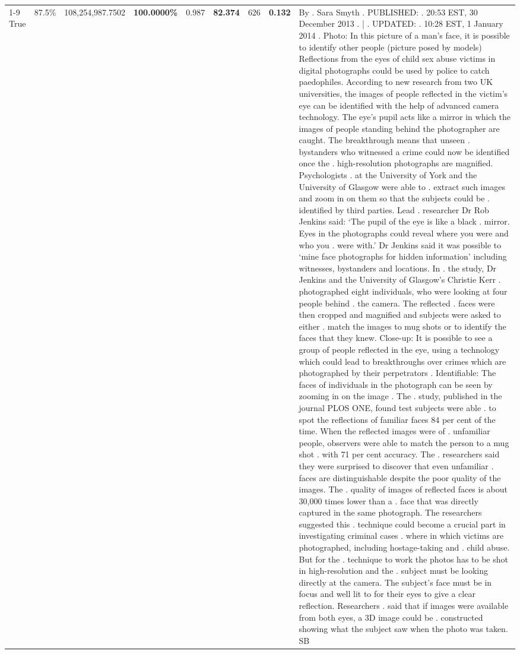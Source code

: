 \begin{table}[H]
\begin{tabular}{lllrlllll}
\cline{1-9} \cline{2-9}
True & 87.5\% & 108,254,987.7502 & \bfseries \color{red} 100.0000\% & 0.987 & \bfseries \color{red} 82.374 & 626 & \bfseries \color{red} 0.132 & By . Sara Smyth . PUBLISHED: . 20:53 EST, 30 December 2013 . | . UPDATED: . 10:28 EST, 1 January 2014 . Photo: In this picture of a man's face, it is possible to identify other people (picture posed by models) Reflections from the eyes of child sex abuse victims in digital photographs could be used by police to catch paedophiles. According to new research from two UK universities, the images of people reflected in the victim's eye can be identified with the help of advanced camera technology. The eye's pupil acts like a mirror in which the images of people standing behind the photographer are caught. The breakthrough means that unseen . bystanders who witnessed a crime could now be identified once the . high-resolution photographs are magnified. Psychologists . at the University of York and the University of Glasgow were able to . extract such images and zoom in on them so that the subjects could be . identified by third parties. Lead . researcher Dr Rob Jenkins said: ‘The pupil of the eye is like a black . mirror. Eyes in the photographs could reveal where you were and who you . were with.' Dr Jenkins said it was possible to ‘mine face photographs for hidden information' including witnesses, bystanders and locations. In . the study, Dr Jenkins and the University of Glasgow's Christie Kerr . photographed eight individuals, who were looking at four people behind . the camera. The reflected . faces were then cropped and magnified and subjects were asked to either . match the images to mug shots or to identify the faces that they knew. Close-up: It is possible to see a group of people reflected in the eye, using a technology which could lead to breakthroughs over crimes which are photographed by their perpetrators . Identifiable: The faces of individuals in the photograph can be seen by zooming in on the image . The . study, published in the journal PLOS ONE, found test subjects were able . to spot the reflections of familiar faces 84 per cent of the time. When the reflected images were of . unfamiliar people, observers were able to match the person to a mug shot . with 71 per cent accuracy. The . researchers said they were surprised to discover that even unfamiliar . faces are distinguishable despite the poor quality of the images. The . quality of images of reflected faces is about 30,000 times lower than a . face that was directly captured in the same photograph. The researchers suggested this . technique could become a crucial part in investigating criminal cases . where in which victims are photographed, including hostage-taking and . child abuse. But for the . technique to work the photos has to be shot in high-resolution and the . subject must be looking directly at the camera. The subject's face must be in focus and well lit to for their eyes to give a clear reflection. Researchers . said that if images were available from both eyes, a 3D image could be . constructed showing what the subject saw when the photo was taken. SB \\

\end{tabular}
\end{table}
